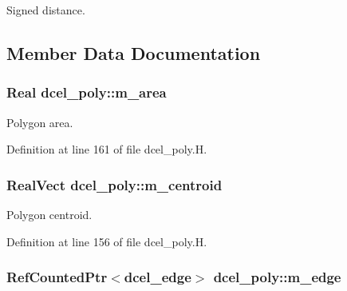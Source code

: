 Signed distance. 



\subsection{Member Data Documentation}
\subsubsection[{\texorpdfstring{m\+\_\+area}{m_area}}]{\setlength{\rightskip}{0pt plus 5cm}Real dcel\+\_\+poly\+::m\+\_\+area\hspace{0.3cm}{\ttfamily [protected]}}\hypertarget{classdcel__poly_abb8df85ed097283a0ec41841cc5e596c}{}\label{classdcel__poly_abb8df85ed097283a0ec41841cc5e596c}


Polygon area. 



Definition at line 161 of file dcel\+\_\+poly.\+H.

\subsubsection[{\texorpdfstring{m\+\_\+centroid}{m_centroid}}]{\setlength{\rightskip}{0pt plus 5cm}Real\+Vect dcel\+\_\+poly\+::m\+\_\+centroid\hspace{0.3cm}{\ttfamily [protected]}}\hypertarget{classdcel__poly_a747a508bdf30fb3883200564ac0b6b26}{}\label{classdcel__poly_a747a508bdf30fb3883200564ac0b6b26}


Polygon centroid. 



Definition at line 156 of file dcel\+\_\+poly.\+H.

\subsubsection[{\texorpdfstring{m\+\_\+edge}{m_edge}}]{\setlength{\rightskip}{0pt plus 5cm}Ref\+Counted\+Ptr$<${\bf dcel\+\_\+edge}$>$ dcel\+\_\+poly\+::m\+\_\+edge\hspace{0.3cm}{\ttfamily [protected]}}\hypertarget{classdcel__poly_aa1869c7861c45b372ea5b93ff2e601e1}{}\label{classdcel__poly_aa1869c7861c45b372ea5b93ff2e601e1}


